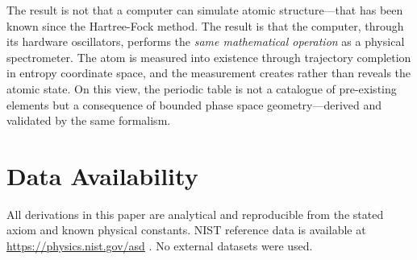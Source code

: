 \documentclass[11pt,twocolumn,a4paper]{article}
\theoremstyle{definition}
\theoremstyle{remark}
\begin{document}
The result is not that a computer can simulate atomic structure---that has been known since the Hartree-Fock method. The result is that the computer, through its hardware oscillators, performs the \emph{same mathematical operation} as a physical spectrometer. The atom is measured into existence through trajectory completion in entropy coordinate space, and the measurement creates rather than reveals the atomic state. On this view, the periodic table is not a catalogue of pre-existing elements but a consequence of bounded phase space geometry---derived and validated by the same formalism.

\section*{Data Availability}

All derivations in this paper are analytical and reproducible from the stated axiom and known physical constants. NIST reference data is available at \url{https://physics.nist.gov/asd} \citep{nist_asd}. No external datasets were used.



\end{document}
